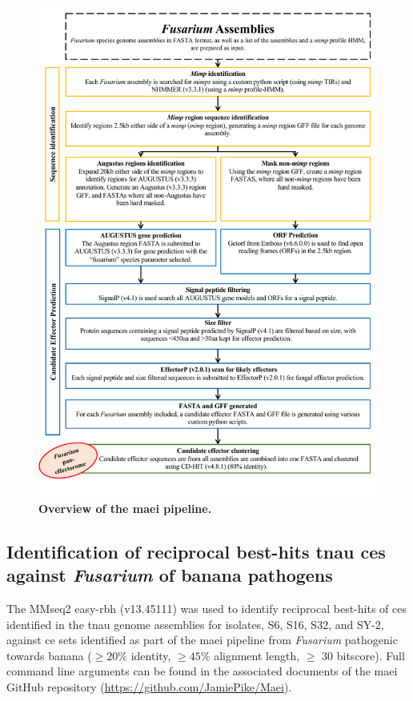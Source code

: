 \begin{figure}[htp!]
    \centering
    \includegraphics[width=14cm]{Figures/Maie_v5_Figure-portrait.pdf}
    \caption[Overview of the \acf{maei} pipeline.]{\textbf{Overview of the \acf{maei} pipeline.}}  
    \label{fig:MaeiPipeline}
\end{figure}

\subsection{Identification of reciprocal best-hits \acl{tnau} \aclp{ce} against \textit{Fusarium} of banana pathogens}

The MMseq2 easy-rbh (v13.45111) \parencite{Steinegger2017} was used to identify reciprocal best-hits of \acp{ce} identified in the \ac{tnau} genome assemblies for isolates, S6, S16, S32, and SY-2, against \ac{ce} sets identified as part of the \ac{maei} pipeline from \textit{Fusarium} pathogenic towards banana ($\geq 20\%$ identity, $\geq 45\%$ alignment length, $\geq$ 30 bitscore). Full command line arguments can be found in the associated documents of the \ac{maei} GitHub repository (\href{https://github.com/JamiePike/Maei}{https://github.com/JamiePike/Maei}).   

